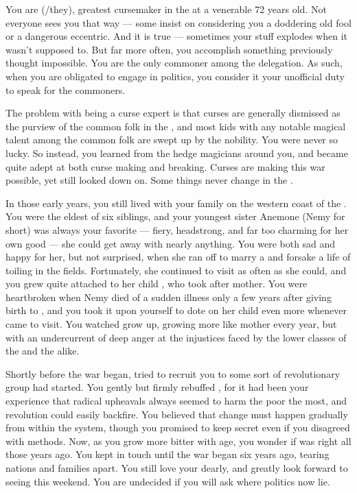 \documentclass[char]{GL2020}
\begin{document}
\name{\cCurse{}}

You are \cCurse{\full} (\cCurse{\they}/they), greatest cursemaker in the \pFarm{} at a venerable 72 years old. Not everyone sees you that way — some insist on considering you a doddering old fool or a dangerous eccentric. And it is true — sometimes your stuff explodes when it wasn't supposed to. But far more often, you accomplish something previously thought impossible. You are the only commoner among the \pFarm{} delegation. As such, when you are obligated to engage in politics, you consider it your unofficial duty to speak for the commoners.

The problem with being a curse expert is that curses are generally dismissed as the purview of the common folk in the \pFarm{}, and most kids with any notable magical talent among the common folk are swept up by the nobility. You were never so lucky. So instead, you learned from the hedge magicians around you, and became quite adept at both curse making and breaking. Curses are making this war possible, yet still looked down on. Some things never change in the \pFarm{}.

In those early years, you still lived with your family on the western coast of the \pFarm{}. You were the eldest of six siblings, and your youngest sister Anemone (Nemy for short) was always your favorite — fiery, headstrong, and far too charming for her own good — she could get away with nearly anything. You were both sad and happy for her, but not surprised, when she ran off to marry a \pShippie{} and forsake a life of toiling in the fields. Fortunately, she continued to visit as often as she could, and you grew quite attached to her child \cChupLeader{}, who took after \cChupLeader{\their} mother. You were heartbroken when Nemy died of a sudden illness only a few years after giving birth to \cChupLeader{}, and you took it upon yourself to dote on her child even more whenever \cChupLeader{\they} came to visit. You watched \cChupLeader{\them} grow up, growing more like \cChupLeader{\their} mother every year, but with an undercurrent of deep anger at the injustices faced by the lower classes of the \pFarm{} and the \pShip{} alike. 

Shortly before the war began, \cChupLeader{\they} tried to recruit you to some sort of revolutionary group \cChupLeader{\they} had started. You gently but firmly rebuffed \cChupLeader{\them}, for it had been your experience that radical upheavals always seemed to harm the poor the most, and revolution could easily backfire. You believed that change must happen gradually from within the system, though you promised to keep \cChupLeader{\their} secret even if you disagreed with \cChupLeader{\their} methods. Now, as you grow more bitter with age, you wonder if \cChupLeader{} was right all those years ago. You kept in touch until the war began six years ago, tearing nations and families apart. You still love your \cChupLeader{\nibling} dearly, and greatly look forward to seeing \cChupLeader{\them} this weekend. You are undecided if you will ask where \cChupLeader{\their} politics now lie.
\end{document}
